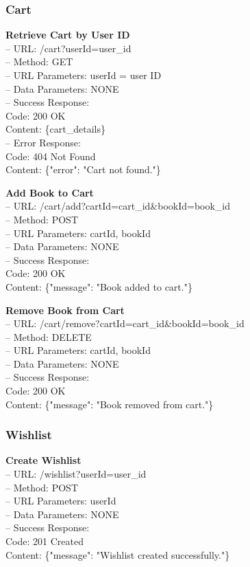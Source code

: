 \subsubsection*{Cart}

\textbf{Retrieve Cart by User ID} \\
– URL: /cart?userId={user\_id} \\
– Method: GET \\
– URL Parameters: userId = user ID \\
– Data Parameters: NONE \\
– Success Response: \\
Code: 200 OK \\
Content: \{cart\_details\} \\
– Error Response: \\
Code: 404 Not Found \\
Content: \{"error": "Cart not found."\}

\textbf{Add Book to Cart} \\
– URL: /cart/add?cartId={cart\_id}\&bookId={book\_id} \\
– Method: POST \\
– URL Parameters: cartId, bookId \\
– Data Parameters: NONE \\
– Success Response: \\
Code: 200 OK \\
Content: \{"message": "Book added to cart."\}

\textbf{Remove Book from Cart} \\
– URL: /cart/remove?cartId={cart\_id}\&bookId={book\_id} \\
– Method: DELETE \\
– URL Parameters: cartId, bookId \\
– Data Parameters: NONE \\
– Success Response: \\
Code: 200 OK \\
Content: \{"message": "Book removed from cart."\}

\subsubsection*{Wishlist}

\textbf{Create Wishlist} \\
– URL: /wishlist?userId={user\_id} \\
– Method: POST \\
– URL Parameters: userId \\
– Data Parameters: NONE \\
– Success Response: \\
Code: 201 Created \\
Content: \{"message": "Wishlist created successfully."\}

